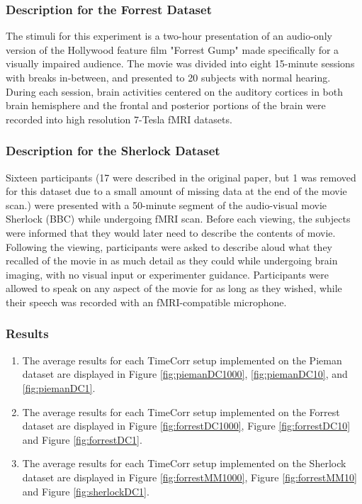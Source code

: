 \documentclass[11pt]{article}
\begin{document}
\subsubsection{Description for the Forrest Dataset}
The stimuli for this experiment is a two-hour presentation of an audio-only version of the Hollywood feature film "Forrest Gump" made specifically for a visually impaired audience. The movie was divided into eight 15-minute sessions with breaks in-between, and presented to 20 subjects with normal hearing. During each session, brain activities centered on the auditory cortices in both brain hemisphere and the frontal and posterior portions of the brain were recorded into high resolution 7-Tesla fMRI datasets.\cite{Hanke2014}

\subsubsection{Description for the Sherlock Dataset}
Sixteen participants (17 were described in the original paper, but 1 was removed for this dataset due to a small amount of missing data at the end of the movie scan.) were presented with a 50-minute segment of the audio-visual movie Sherlock (BBC) while undergoing fMRI scan. Before each viewing, the subjects were informed that they would later need to describe the contents of movie. Following the viewing, participants were asked to describe aloud what they recalled of the movie in as much detail as they could while undergoing brain imaging, with no visual input or experimenter guidance. Participants were allowed to speak on any aspect of the movie for as long as they wished, while their speech was recorded with an fMRI-compatible microphone. \cite{Chen2017}

\subsubsection{Results}
\begin{enumerate}
\item The average results for each TimeCorr setup implemented on the Pieman dataset are displayed in Figure \ref{fig:piemanDC1000}, \ref{fig:piemanDC10}, and \ref{fig:piemanDC1}.
\item The average results for each TimeCorr setup implemented on the Forrest dataset are displayed in Figure \ref{fig:forrestDC1000}, Figure \ref{fig:forrestDC10} and Figure \ref{fig:forrestDC1}.
\item The average results for each TimeCorr setup implemented on the Sherlock dataset are displayed in Figure \ref{fig:forrestMM1000}, Figure \ref{fig:forrestMM10} and Figure \ref{fig:sherlockDC1}.
\end{enumerate}
\end{document}
